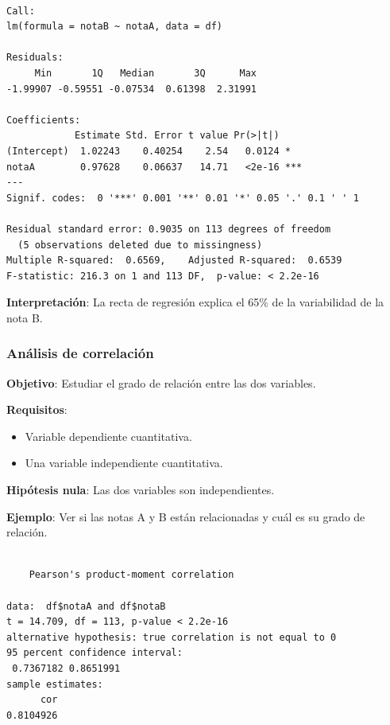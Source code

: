 \documentclass[
  spanish,
  a4paper,
]{scrreport}
\newenvironment{Shaded}{\begin{snugshade}}{\end{snugshade}}
\newcommand{\CommentTok}[1]{\textcolor[rgb]{0.37,0.37,0.37}{#1}}
\newcommand{\FunctionTok}[1]{\textcolor[rgb]{0.28,0.35,0.67}{#1}}
\newcommand{\NormalTok}[1]{\textcolor[rgb]{0.00,0.23,0.31}{#1}}
\newcommand{\SpecialCharTok}[1]{\textcolor[rgb]{0.37,0.37,0.37}{#1}}
\providecommand{\tightlist}{%
  \setlength{\itemsep}{0pt}\setlength{\parskip}{0pt}}
\theoremstyle{definition}
\theoremstyle{definition}
\theoremstyle{remark}
\begin{document}
\begin{verbatim}

Call:
lm(formula = notaB ~ notaA, data = df)

Residuals:
     Min       1Q   Median       3Q      Max 
-1.99907 -0.59551 -0.07534  0.61398  2.31991 

Coefficients:
            Estimate Std. Error t value Pr(>|t|)    
(Intercept)  1.02243    0.40254    2.54   0.0124 *  
notaA        0.97628    0.06637   14.71   <2e-16 ***
---
Signif. codes:  0 '***' 0.001 '**' 0.01 '*' 0.05 '.' 0.1 ' ' 1

Residual standard error: 0.9035 on 113 degrees of freedom
  (5 observations deleted due to missingness)
Multiple R-squared:  0.6569,    Adjusted R-squared:  0.6539 
F-statistic: 216.3 on 1 and 113 DF,  p-value: < 2.2e-16
\end{verbatim}

\textbf{Interpretación}: La recta de regresión explica el 65\% de la
variabilidad de la nota B.

\subsubsection{Análisis de
correlación}\label{anuxe1lisis-de-correlaciuxf3n}

\textbf{Objetivo}: Estudiar el grado de relación entre las dos
variables.

\textbf{Requisitos}:

\begin{itemize}
\tightlist
\item
  Variable dependiente cuantitativa.
\item
  Una variable independiente cuantitativa.
\end{itemize}

\textbf{Hipótesis nula}: Las dos variables son independientes.

\textbf{Ejemplo}: Ver si las notas A y B están relacionadas y cuál es su
grado de relación.

\begin{Shaded}
\end{Shaded}

\begin{verbatim}

    Pearson's product-moment correlation

data:  df$notaA and df$notaB
t = 14.709, df = 113, p-value < 2.2e-16
alternative hypothesis: true correlation is not equal to 0
95 percent confidence interval:
 0.7367182 0.8651991
sample estimates:
      cor 
0.8104926 
\end{verbatim}
\end{document}
